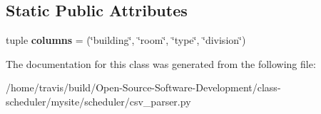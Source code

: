 \subsection*{Static Public Attributes}
\begin{DoxyCompactItemize}
\item 
\hypertarget{classscheduler_1_1csv__parser_1_1_room_parser_a032f2c787da1fa2509d92458b20b3456}{tuple {\bfseries columns} = (\char`\"{}building\char`\"{}, \char`\"{}room\char`\"{}, \char`\"{}type\char`\"{}, \char`\"{}division\char`\"{})}\label{classscheduler_1_1csv__parser_1_1_room_parser_a032f2c787da1fa2509d92458b20b3456}

\end{DoxyCompactItemize}


The documentation for this class was generated from the following file\-:\begin{DoxyCompactItemize}
\item 
/home/travis/build/\-Open-\/\-Source-\/\-Software-\/\-Development/class-\/scheduler/mysite/scheduler/csv\-\_\-parser.\-py\end{DoxyCompactItemize}
